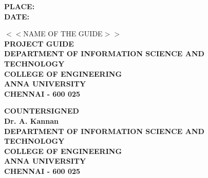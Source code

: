 \documentclass[13 pt,a4paper,twoside]{aureportm}%
\begin{document}
\begin{flushleft}
 \parbox[t]{\datewidth}{\small{\textbf{PLACE: }}\\
 \small{\textbf{DATE: }}}
 \hfill
 \parbox[t]{9 cm}{\scriptsize{$<<$NAME OF THE GUIDE$>>$} \\
 \scriptsize{\textbf{PROJECT GUIDE}}\\
 \scriptsize{\textbf{DEPARTMENT OF INFORMATION SCIENCE AND TECHNOLOGY}}\\
 \scriptsize{\textbf{COLLEGE OF ENGINEERING}}\\
 \scriptsize{\textbf{ANNA UNIVERSITY}}   \\
 \scriptsize{\textbf{CHENNAI - 600 025}}
 }
\end{flushleft}
\vspace{1 cm}
\begin{center}
 \small{\textbf{COUNTERSIGNED}}\\ 
  \vspace{1 cm}
  \textbf{\small{Dr. A. Kannan}}\\ 
 \scriptsize{\textbf{DEPARTMENT OF INFORMATION SCIENCE AND TECHNOLOGY}}\\
 \scriptsize{\textbf{COLLEGE OF ENGINEERING}}\\
 \scriptsize{\textbf{ANNA UNIVERSITY}}   \\
 \scriptsize{\textbf{CHENNAI - 600 025}}
 
\end{center}




%





\tableofcontents


\pagebreak

\listoftables
 \clearpage {} \listoffigures
\end{document}
